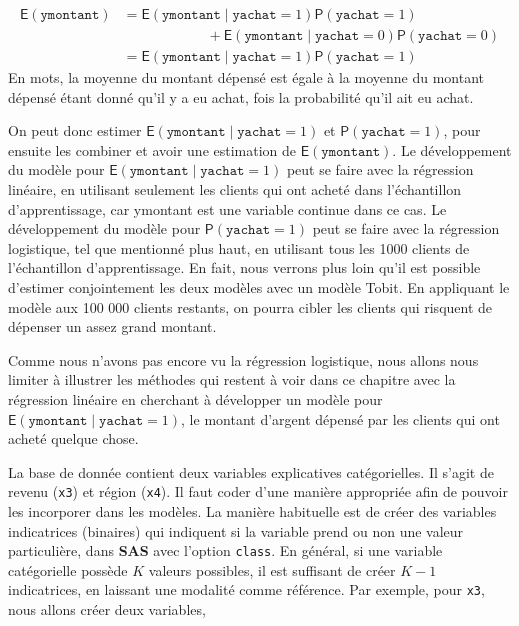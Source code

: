 \documentclass[
  11pt,
  letterpaper,
]{book}
\theoremstyle{definition}
\theoremstyle{definition}
\theoremstyle{definition}
\theoremstyle{definition}
\theoremstyle{remark}
\begin{document}
\begin{align*} 
{\mathsf E}\left(\texttt{ymontant}\right) &= {\mathsf E}\left(\texttt{ymontant} \mid \texttt{yachat}=1\right) {\mathsf P}\left(\texttt{yachat}=1\right) \\& \qquad \qquad \qquad +
{\mathsf E}\left(\texttt{ymontant} \mid \texttt{yachat}=0\right) {\mathsf P}\left(\texttt{yachat}=0\right) \\
 &= {\mathsf E}\left(\texttt{ymontant} \mid \texttt{yachat}=1\right) {\mathsf P}\left(\texttt{yachat}=1\right)
\end{align*}
En mots, la moyenne du montant dépensé est égale à la moyenne du montant dépensé étant donné qu'il y a eu achat, fois la probabilité qu'il ait eu achat.

On peut donc estimer \({\mathsf E}\left(\texttt{ymontant} \mid \texttt{yachat}=1\right)\) et \({\mathsf P}\left(\texttt{yachat}=1\right)\), pour ensuite les combiner et avoir une estimation de \({\mathsf E}\left(\texttt{ymontant}\right)\). Le développement du modèle pour \({\mathsf E}\left(\texttt{ymontant} \mid \texttt{yachat}=1\right)\) peut se faire avec la régression linéaire, en utilisant seulement les clients qui ont acheté dans l'échantillon d'apprentissage, car ymontant est une variable continue dans ce cas. Le développement du modèle pour \({\mathsf P}\left(\texttt{yachat}=1\right)\) peut se faire avec la régression logistique, tel que mentionné plus haut, en utilisant tous les 1000 clients de l'échantillon d'apprentissage. En fait, nous verrons plus loin qu'il est possible d'estimer conjointement les deux modèles avec un modèle Tobit. En appliquant le modèle aux 100 000 clients restants, on pourra cibler les clients qui risquent de dépenser un assez grand montant.

Comme nous n'avons pas encore vu la régression logistique, nous allons nous limiter à illustrer les méthodes qui restent à voir dans ce chapitre avec la régression linéaire en cherchant à développer un modèle pour \({\mathsf E}\left(\texttt{ymontant} \mid \texttt{yachat}=1\right)\), le montant d'argent dépensé par les clients qui ont acheté quelque chose.

La base de donnée contient deux variables explicatives catégorielles. Il s'agit de revenu (\texttt{x3}) et région (\texttt{x4}). Il faut coder d'une manière appropriée afin de pouvoir les incorporer dans les modèles. La manière habituelle est de créer des variables indicatrices (binaires) qui indiquent si la variable prend ou non une valeur particulière, dans \textbf{SAS} avec l'option \texttt{class}. En général, si une variable catégorielle possède \(K\) valeurs possibles, il est suffisant de créer \(K-1\) indicatrices, en laissant une modalité comme référence. Par exemple, pour \texttt{x3}, nous allons créer deux variables,
\end{document}
